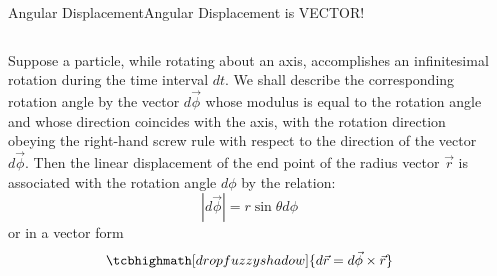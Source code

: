 \documentclass[18pt]{LectMechanics}
\begin{document}
\begin{frame}{Angular Displacement}{Angular Displacement is VECTOR!}
	\begin{columns}
		\begin{column}{0.5\linewidth}
			\begin{overprint}
				Suppose a particle, while rotating about an axis, accomplishes an infinitesimal rotation
				during the time interval $dt$. We shall describe the  corresponding rotation angle by the vector $d\vec{\phi}$ whose modulus is equal to the rotation angle and whose direction coincides with the axis, with the rotation direction obeying the right-hand screw rule with respect to the direction of the  vector $d\vec{\phi}$.
				\onslide<2>
				Then the linear displacement of the end point of the radius vector $\vec r$ is
				associated with the rotation angle $d\phi$ by the relation:
				\begin{equation*}
					|d\vec{\phi}| = r\sin\theta d\phi
				\end{equation*}
				or in a vector form
				\begin{equation*}
					\tcbhighmath[drop fuzzy shadow]{d\vec r =  d\vec\phi \times \vec{r}}
				\end{equation*}
			\end{overprint}
		\end{column}
		\begin{column}{0.5\linewidth}
			\begin{center}
			\end{center}
		\end{column}
	\end{columns}
\end{frame}
\end{document}
